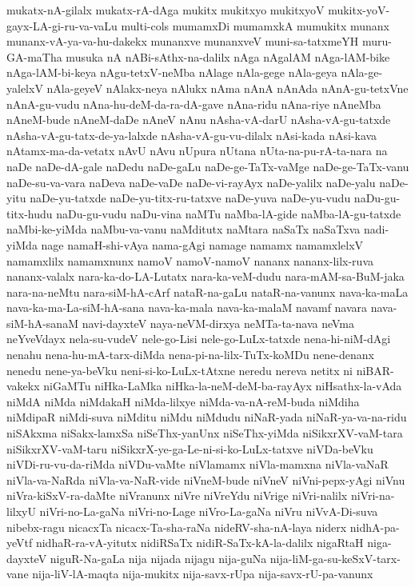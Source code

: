 {mukatx-nA-gilalx
mukatx-rA-dAga
mukitx
mukitxyo
mukitxyoV
mukitx-yoV-gayx-LA-gi-ru-va-vaLu
multi-cols
mumamxDi
mumamxkA
mumukitx
munanx
munanx-vA-ya-va-hu-dakekx
munanxve
munanxveV
muni-sa-tatxmeYH
muru-GA-maTha
musuka
nA
nABi-sAthx-na-dalilx
nAga
nAgalAM
nAga-lAM-bike
nAga-lAM-bi-keya
nAgu-tetxV-neMba
nAlage
nAla-gege
nAla-geya
nAla-ge-yalelxV
nAla-geyeV
nAlakx-neya
nAlukx
nAma
nAnA
nAnAda
nAnA-gu-tetxVne
nAnA-gu-vudu
nAna-hu-deM-da-ra-dA-gave
nAna-ridu
nAna-riye
nAneMba
nAneM-bude
nAneM-daDe
nAneV
nAnu
nAsha-vA-darU
nAsha-vA-gu-tatxde
nAsha-vA-gu-tatx-de-ya-lalxde
nAsha-vA-gu-vu-dilalx
nAsi-kada
nAsi-kava
nAtamx-ma-da-vetatx
nAvU
nAvu
nUpura
nUtana
nUta-na-pu-rA-ta-nara
na
naDe
naDe-dA-gale
naDedu
naDe-gaLu
naDe-ge-TaTx-vaMge
naDe-ge-TaTx-vanu
naDe-su-va-vara
naDeva
naDe-vaDe
naDe-vi-rayAyx
naDe-yalilx
naDe-yalu
naDe-yitu
naDe-yu-tatxde
naDe-yu-titx-ru-tatxve
naDe-yuva
naDe-yu-vudu
naDu-gu-titx-hudu
naDu-gu-vudu
naDu-vina
naMTu
naMba-lA-gide
naMba-lA-gu-tatxde
naMbi-ke-yiMda
naMbu-va-vanu
naMditutx
naMtara
naSaTx
naSaTxva
nadi-yiMda
nage
namaH-shi-vAya
nama-gAgi
namage
namamx
namamxlelxV
namamxlilx
namamxnunx
namoV
namoV-namoV
nananx
nananx-lilx-ruva
nananx-valalx
nara-ka-do-LA-Lutatx
nara-ka-veM-dudu
nara-mAM-sa-BuM-jaka
nara-na-neMtu
nara-siM-hA-cArf
nataR-na-gaLu
nataR-na-vanunx
nava-ka-maLa
nava-ka-ma-La-siM-hA-sana
nava-ka-mala
nava-ka-malaM
navamf
navara
nava-siM-hA-sanaM
navi-dayxteV
naya-neVM-dirxya
neMTa-ta-nava
neVma
neYveVdayx
nela-su-vudeV
nele-go-Lisi
nele-go-LuLx-tatxde
nena-hi-niM-dAgi
nenahu
nena-hu-mA-tarx-diMda
nena-pi-na-lilx-TuTx-koMDu
nene-denanx
nenedu
nene-ya-beVku
neni-si-ko-LuLx-tAtxne
neredu
nereva
netitx
ni
niBAR-vakekx
niGaMTu
niHka-LaMka
niHka-la-neM-deM-ba-rayAyx
niHsathx-la-vAda
niMdA
niMda
niMdakaH
niMda-lilxye
niMda-va-nA-reM-buda
niMdiha
niMdipaR
niMdi-suva
niMditu
niMdu
niMdudu
niNaR-yada
niNaR-ya-va-na-ridu
niSAkxma
niSakx-lamxSa
niSeThx-yanUnx
niSeThx-yiMda
niSikxrXV-vaM-tara
niSikxrXV-vaM-taru
niSikxrX-ye-ga-Le-ni-si-ko-LuLx-tatxve
niVDa-beVku
niVDi-ru-vu-da-riMda
niVDu-vaMte
niVlamamx
niVla-mamxna
niVla-vaNaR
niVla-va-NaRda
niVla-va-NaR-vide
niVneM-bude
niVneV
niVni-pepx-yAgi
niVnu
niVra-kiSxV-ra-daMte
niVranunx
niVre
niVreYdu
niVrige
niVri-nalilx
niVri-na-lilxyU
niVri-no-La-gaNa
niVri-no-Lage
niVro-La-gaNa
niVru
niVvA-Di-suva
nibebx-ragu
nicacxTa
nicacx-Ta-sha-raNa
nideRV-sha-nA-laya
niderx
nidhA-pa-yeVtf
nidhaR-ra-vA-yitutx
nidiRSaTx
nidiR-SaTx-kA-la-dalilx
nigaRtaH
niga-dayxteV
niguR-Na-gaLa
nija
nijada
nijagu
nija-guNa
nija-liM-ga-su-keSxV-tarx-vane
nija-liV-lA-maqta
nija-mukitx
nija-savx-rUpa
nija-savx-rU-pa-vanunx
}
